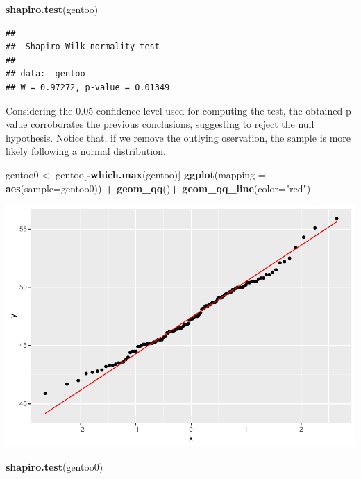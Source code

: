 \documentclass[
]{article}
\newenvironment{Shaded}{\begin{snugshade}}{\end{snugshade}}
\newcommand{\AttributeTok}[1]{\textcolor[rgb]{0.13,0.29,0.53}{#1}}
\newcommand{\FunctionTok}[1]{\textcolor[rgb]{0.13,0.29,0.53}{\textbf{#1}}}
\newcommand{\NormalTok}[1]{#1}
\newcommand{\OtherTok}[1]{\textcolor[rgb]{0.56,0.35,0.01}{#1}}
\newcommand{\SpecialCharTok}[1]{\textcolor[rgb]{0.81,0.36,0.00}{\textbf{#1}}}
\newcommand{\StringTok}[1]{\textcolor[rgb]{0.31,0.60,0.02}{#1}}
\begin{document}
\begin{Shaded}
\begin{Highlighting}[]
\FunctionTok{shapiro.test}\NormalTok{(gentoo)}
\end{Highlighting}
\end{Shaded}

\begin{verbatim}
## 
##  Shapiro-Wilk normality test
## 
## data:  gentoo
## W = 0.97272, p-value = 0.01349
\end{verbatim}

Considering the 0.05 confidence level used for computing the test, the
obtained p-value corroborates the previous conclusions, suggesting to
reject the null hypothesis. Notice that, if we remove the outlying
oservation, the sample is more likely following a normal distribution.

\begin{Shaded}
\begin{Highlighting}[]
\NormalTok{gentoo0 }\OtherTok{\textless{}{-}}\NormalTok{ gentoo[}\SpecialCharTok{{-}}\FunctionTok{which.max}\NormalTok{(gentoo)]}
\FunctionTok{ggplot}\NormalTok{(}\AttributeTok{mapping =} \FunctionTok{aes}\NormalTok{(}\AttributeTok{sample=}\NormalTok{gentoo0)) }\SpecialCharTok{+} 
  \FunctionTok{geom\_qq}\NormalTok{()}\SpecialCharTok{+}
  \FunctionTok{geom\_qq\_line}\NormalTok{(}\AttributeTok{color=}\StringTok{"red"}\NormalTok{)}
\end{Highlighting}
\end{Shaded}

\includegraphics{Tests_and_Applications_files/figure-latex/unnamed-chunk-13-1.pdf}

\begin{Shaded}
\begin{Highlighting}[]
\FunctionTok{shapiro.test}\NormalTok{(gentoo0)}
\end{Highlighting}
\end{Shaded}
\end{document}
